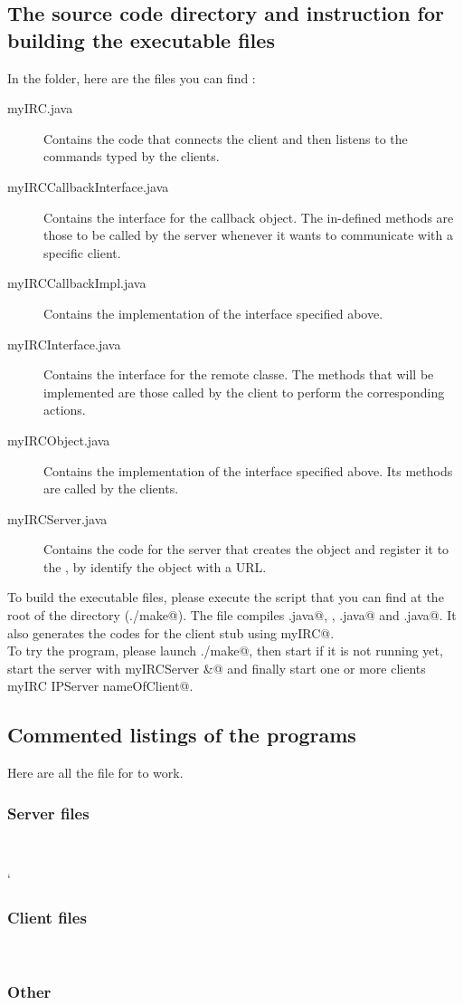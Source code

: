 \documentclass{article}
\begin{document}
\subsection{The source code directory and instruction for building the executable files}
In the \verb@src@ folder, here are the files you can find : 
\begin{description}
\item[myIRC.java] Contains the code that connects the client and then listens to the commands typed by the clients.
\item[myIRCCallbackInterface.java] Contains the interface for the callback object. The in-defined methods are those to be called by the server whenever it wants to communicate with a specific client.
\item[myIRCCallbackImpl.java] Contains the implementation of the interface specified above.
\item[myIRCInterface.java] Contains the interface for the remote classe. The methods that will be implemented are those called by the client to perform the corresponding actions.
\item[myIRCObject.java] Contains the implementation of the interface specified above. Its methods are called by the clients.
\item[myIRCServer.java] Contains the code for the server that creates the object \verb@myIRCObject@ and register it to the \verb@rmiregistry@, by identify the object with a URL. 
\end{description}

To build the executable files, please execute the script \verb@make@ that you can find at the root of the directory (\verb@./make@). The \verb@make@ file compiles \verb@myIRCObject.java@, \verb@myIRCCallbackImpl@, \verb@myIRCServer.java@ and \verb@myIRC.java@. It also generates the codes for the client stub using \verb@rmic myIRC@.\\

To try the program, please launch \verb@./make@, then start \verb@rmiregistry@ if it is not running yet, start the server with \verb@java myIRCServer &@ and finally start one or more clients \verb@java myIRC IPServer nameOfClient@.

\subsection{Commented listings of the programs}
Here are all the file for \verb@myIRC@ to work.

\subsubsection{Server files}~
	
	`
	
\subsubsection{Client files}~
	
	
	
\subsubsection{Other}~
	
\end{document}
